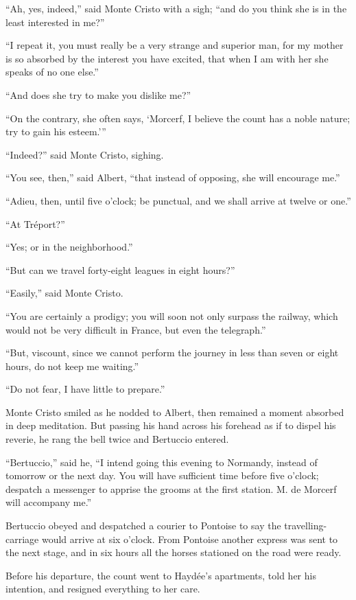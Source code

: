 “Ah, yes, indeed,” said Monte Cristo with a sigh; “and do you think she
is in the least interested in me?”

“I repeat it, you must really be a very strange and superior man, for
my mother is so absorbed by the interest you have excited, that when I
am with her she speaks of no one else.”

“And does she try to make you dislike me?”

“On the contrary, she often says, ‘Morcerf, I believe the count has a
noble nature; try to gain his esteem.’”

“Indeed?” said Monte Cristo, sighing.

“You see, then,” said Albert, “that instead of opposing, she will
encourage me.”

“Adieu, then, until five o’clock; be punctual, and we shall arrive at
twelve or one.”

“At Tréport?”

“Yes; or in the neighborhood.”

“But can we travel forty-eight leagues in eight hours?”

“Easily,” said Monte Cristo.

“You are certainly a prodigy; you will soon not only surpass the
railway, which would not be very difficult in France, but even the
telegraph.”

“But, viscount, since we cannot perform the journey in less than seven
or eight hours, do not keep me waiting.”

“Do not fear, I have little to prepare.”

Monte Cristo smiled as he nodded to Albert, then remained a moment
absorbed in deep meditation. But passing his hand across his forehead
as if to dispel his reverie, he rang the bell twice and Bertuccio
entered.

“Bertuccio,” said he, “I intend going this evening to Normandy, instead
of tomorrow or the next day. You will have sufficient time before five
o’clock; despatch a messenger to apprise the grooms at the first
station. M. de Morcerf will accompany me.”

Bertuccio obeyed and despatched a courier to Pontoise to say the
travelling-carriage would arrive at six o’clock. From Pontoise another
express was sent to the next stage, and in six hours all the horses
stationed on the road were ready.

Before his departure, the count went to Haydée’s apartments, told her
his intention, and resigned everything to her care.

